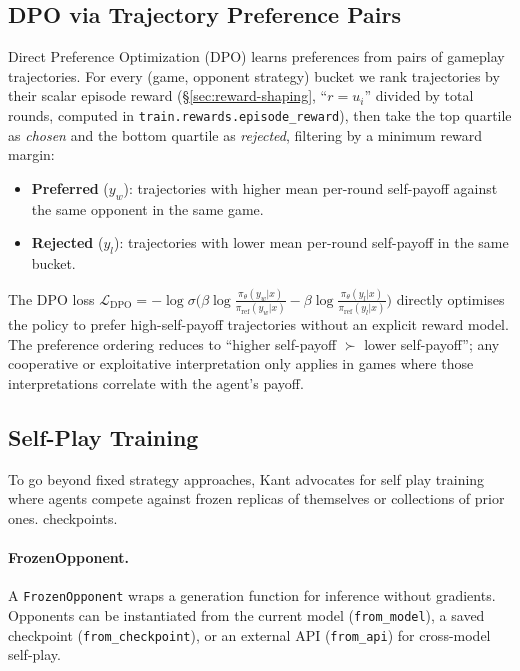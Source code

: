 \subsection{DPO via Trajectory Preference Pairs}
\label{sec:dpo}

Direct Preference Optimization (DPO) learns preferences from pairs of
gameplay trajectories. For every (game, opponent strategy) bucket we
rank trajectories by their scalar episode reward (\S\ref{sec:reward-shaping},
``$r = u_i$'' divided by total rounds, computed in
\texttt{train.rewards.episode\_reward}), then take the top quartile as
\emph{chosen} and the bottom quartile as \emph{rejected}, filtering by a
minimum reward margin:

\begin{itemize}[nosep]
    \item \textbf{Preferred} ($y_w$): trajectories with higher mean
          per-round self-payoff against the same opponent in the same game.
    \item \textbf{Rejected} ($y_l$): trajectories with lower mean
          per-round self-payoff in the same bucket.
\end{itemize}

\noindent The DPO loss $\mathcal{L}_{\text{DPO}} = -\log\sigma\bigl(
\beta \log \frac{\pi_\theta(y_w|x)}{\pi_{\text{ref}}(y_w|x)} -
\beta \log \frac{\pi_\theta(y_l|x)}{\pi_{\text{ref}}(y_l|x)}\bigr)$
directly optimises the policy to prefer high-self-payoff trajectories
without an explicit reward model. The preference ordering reduces to
``higher self-payoff $\succ$ lower self-payoff''; any cooperative or
exploitative interpretation only applies in games where those
interpretations correlate with the agent's payoff.

\subsection{Self-Play Training}
\label{sec:self-play}

To go beyond fixed strategy approaches, Kant advocates for self play training where agents compete against frozen replicas of themselves or collections of prior ones.
checkpoints.

\paragraph{FrozenOpponent.}
A \texttt{FrozenOpponent} wraps a generation function for inference without
gradients. Opponents can be instantiated from the current model
(\texttt{from\_model}), a saved checkpoint (\texttt{from\_checkpoint}), or
an external API (\texttt{from\_api}) for cross-model self-play.

